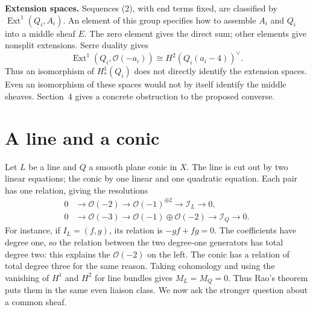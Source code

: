 \documentclass[11pt,a4paper]{article}
\theoremstyle{remark}
\begin{document}
\textbf{Extension spaces.}
Sequences (2), with end terms fixed,
are classified by
$\operatorname{Ext}^1(Q_i,A_i)$.
An element of this group specifies how
to assemble $A_i$ and $Q_i$ into a
middle sheaf $E$. The zero element
gives the direct sum; other elements
give nonsplit extensions.
Serre duality gives
$$
\operatorname{Ext}^1
(Q_i,\mathcal{O}(-a_i))
\cong H^2(Q_i(a_i-4))^\vee.
$$
Thus an isomorphism of $H^1_*(Q_i)$
does not directly identify the
extension spaces. Even an isomorphism
of these spaces would not by itself
identify the middle sheaves.
Section~4 gives a concrete obstruction
to the proposed converse.

\section{A line and a conic}

Let $L$ be a line and $Q$ a smooth
plane conic in $X$.
The line is cut out by two linear
equations; the conic by one linear and
one quadratic equation. Each pair has
one relation, giving the resolutions
$$
\begin{aligned}
0&\longrightarrow\mathcal{O}(-2)
\longrightarrow\mathcal{O}(-1)^{\oplus2}
\longrightarrow\mathcal{I}_L
\longrightarrow0,\\
0&\longrightarrow\mathcal{O}(-3)
\longrightarrow
\mathcal{O}(-1)\oplus\mathcal{O}(-2)
\longrightarrow\mathcal{I}_Q
\longrightarrow0.
\end{aligned}
$$
For instance, if $I_L=(f,g)$, its relation
is $-gf+fg=0$. The coefficients have
degree one, so the relation between the
two degree-one generators has total
degree two: this explains the
$\mathcal{O}(-2)$ on the left.
The conic has a relation of total
degree three for the same reason.
Taking cohomology and using the
vanishing of $H^1$ and $H^2$ for line
bundles gives $M_L=M_Q=0$.
Thus Rao's theorem puts them in the same
even liaison class. We now ask the
stronger question about a common sheaf.
\end{document}
